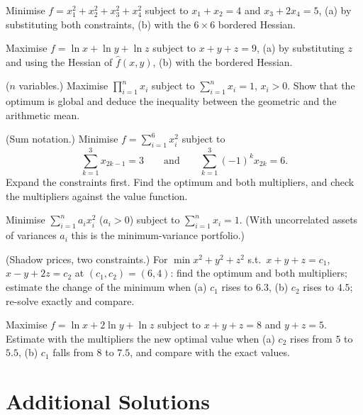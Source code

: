 \begin{problems}
  \item Minimise $f=x_1^{2}+x_2^{2}+x_3^{2}+x_4^{2}$ subject to
        $x_1+x_2=4$ and $x_3+2x_4=5$, (a) by substituting both constraints,
        (b) with the $6\times6$ bordered Hessian.
  \item Maximise $f=\ln x+\ln y+\ln z$ subject to $x+y+z=9$, (a) by
        substituting $z$ and using the Hessian of $\hat f(x,y)$, (b) with
        the bordered Hessian.
  \item ($n$ variables.) Maximise $\prod_{i=1}^{n}x_i$ subject to
        $\sum_{i=1}^{n}x_i=1$, $x_i>0$. Show that the optimum is global and
        deduce the inequality between the geometric and the arithmetic
        mean.
  \item (Sum notation.) Minimise $f=\sum_{i=1}^{6}x_i^{2}$ subject to
        \[
          \sum_{k=1}^{3}x_{2k-1}=3
          \qquad\text{and}\qquad
          \sum_{k=1}^{3}(-1)^{k}x_{2k}=6 .
        \]
        Expand the constraints first. Find the optimum and both
        multipliers, and check the multipliers against the value function.
  \item Minimise $\sum_{i=1}^{n}a_ix_i^{2}$ ($a_i>0$) subject to
        $\sum_{i=1}^{n}x_i=1$. (With uncorrelated assets of variances $a_i$
        this is the minimum-variance portfolio.)
  \item (Shadow prices, two constraints.) For $\min x^{2}+y^{2}+z^{2}$
        s.t.\ $x+y+z=c_1$, $x-y+2z=c_2$ at $(c_1,c_2)=(6,4)$: find the
        optimum and both multipliers; estimate the change of the minimum
        when (a) $c_1$ rises to $6.3$, (b) $c_2$ rises to $4.5$; re-solve
        exactly and compare.
  \item Maximise $f=\ln x+2\ln y+\ln z$ subject to $x+y+z=8$ and $y+z=5$.
        Estimate with the multipliers the new optimal value when (a) $c_2$
        rises from $5$ to $5.5$, (b) $c_1$ falls from $8$ to $7.5$, and
        compare with the exact values.
\end{problems}

\section{Additional Solutions}

